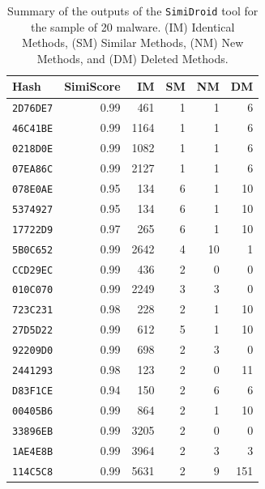 \begin{table}[ht]
  \centering
  \caption{Summary of the outputs of the \texttt{SimiDroid} tool for the sample of 20
    \gps malware. (IM) Identical Methods, (SM) Similar Methods, (NM) New Methods, and
    (DM) Deleted Methods.}
  \begin{tabular}{lrrrrr}
   \toprule
    Hash & SimiScore & IM & SM & NM & DM \\ 
   \midrule
   \texttt{2D76DE7} & 0.99 & 461 &    1 &   1 &   6 \\ 
   \texttt{46C41BE} & 0.99 & 1164 &   1 &   1 &   6 \\ 
   \texttt{0218D0E} & 0.99 & 1082 &   1 &   1 &   6 \\ 
   \texttt{07EA86C} & 0.99 & 2127 &   1 &   1 &   6 \\ 
   \texttt{078E0AE} & 0.95 & 134 &   6 &   1 &  10 \\ 
   \texttt{5374927} & 0.95 & 134 &   6 &   1 &  10 \\ 
   \texttt{17722D9} & 0.97 & 265 &   6 &   1 &  10 \\ 
   \texttt{5B0C652} & 0.99 & 2642 &   4 &  10 &   1 \\ 
   \texttt{CCD29EC} & 0.99 & 436 &   2 &   0 &   0 \\ 
   \texttt{010C070} & 0.99 & 2249 &   3 &   3 &   0 \\ 
   \texttt{723C231} & 0.98 & 228 &   2 &   1 &  10 \\ 
   \texttt{27D5D22} & 0.99 & 612 &   5 &   1 &  10 \\ 
   \texttt{92209D0} & 0.99 & 698 &   2 &   3 &   0 \\ 
   \texttt{2441293} & 0.98 & 123 &   2 &   0 &  11 \\ 
   \texttt{D83F1CE} & 0.94 & 150 &   2 &   6 &   6 \\ 
   \texttt{00405B6} & 0.99 & 864 &   2 &   1 &  10 \\ 
   \texttt{33896EB} & 0.99 & 3205 &   2 &   0 &   0 \\ 
   \texttt{1AE4E8B} & 0.99 & 3964 &   2 &   3 &   3 \\
   \texttt{114C5C8} & 0.99 & 5631 &   2 &   9 & 151 \\ 
   \bottomrule
 \end{tabular}
 \label{tab:simidroid-outputs}
 \end{table}



